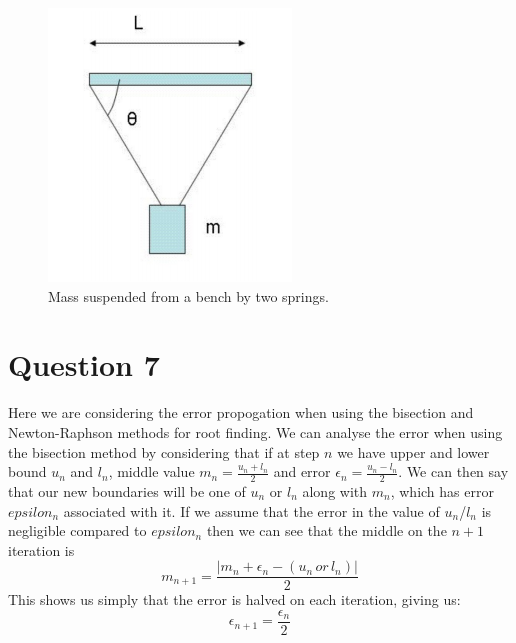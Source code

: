 \documentclass[a4paper,12pt]{UoBnote}
\begin{document}
\begin{figure}
	\centering
	\includegraphics[scale=1]{masses}
	\caption{Mass suspended from a bench by two springs.}
	\label{fig:masses}
\end{figure}

\section{Question 7}

Here we are considering the error propogation when using the bisection and Newton-Raphson methods for root finding. We can analyse the error when using the bisection method by considering that if at step $n$ we have upper and lower bound $u_n$ and $l_n$, middle value $m_n=\frac{u_n+l_n}{2}$ and error $\epsilon_n=\frac{u_n-l_n}{2}$. We can then say that our new boundaries will be one of $u_n$ or $l_n$ along with $m_n$, which has error $epsilon_n$ associated with it. If we assume that the error in the value of $u_n$/$l_n$ is negligible compared to $epsilon_n$ then we can see that the middle on the $n+1$ iteration is \[m_{n+1}=\frac{|m_n+\epsilon_n-(u_n\, or\, l_n)|}{2}\] This shows us simply that the error is halved on each iteration, giving us: \[\epsilon_{n+1}=\frac{\epsilon_n}{2}\]

\printbibliography
\end{document}
